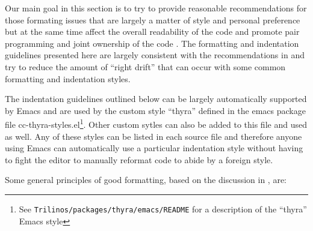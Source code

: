 Our main goal in this section is to try to provide reasonable recommendations
for those formating issues that are largely a matter of style and personal
preference but at the same time affect the overall readability of the code and
promote pair programming and joint ownership of the code
{}\cite{ExtremeProgrammingExplained99}.  The formatting and indentation
guidelines presented here are largely consistent with the recommendations in
{}\cite[Chapter 31]{CodeComplete2nd04} and try to reduce the amount of ``right
drift'' that can occur with some common formatting and indentation styles.

The indentation guidelines outlined below can be largely automatically
supported by Emacs and are used by the custom style ``thyra'' defined in the
emacs package file cc-thyra-styles.el\footnote{See
{}\texttt{Trilinos/packages/thyra/emacs/README} for a description of the
``thyra'' Emacs style}.  Other custom sytles can also be added to this file
and used as well.  Any of these styles can be listed in each source file and
therefore anyone using Emacs can automatically use a particular indentation
style without having to fight the editor to manually reformat code to abide by
a foreign style.

Some general principles of good formatting, based on the discussion in
{}\cite[Section 31.1]{CodeComplete2nd04}, are:

